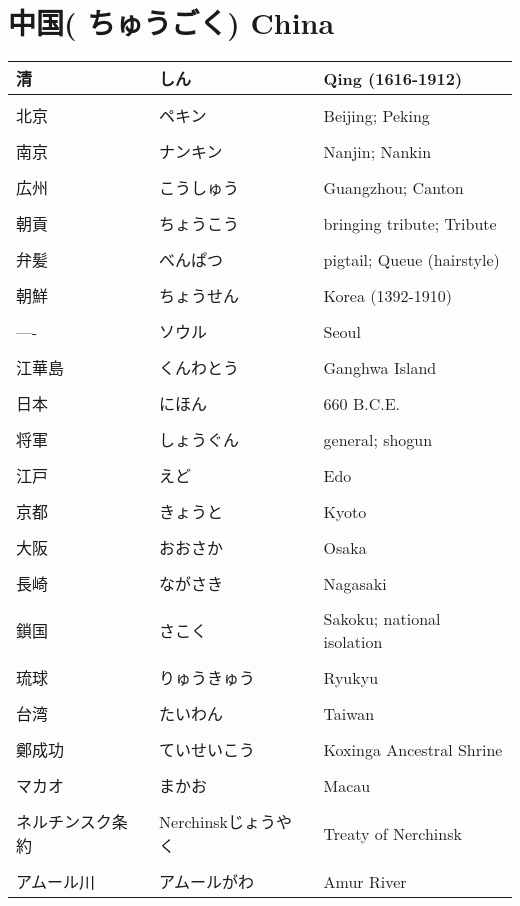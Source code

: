\documentclass{article}
\begin{document}
\section{中国( ちゅうごく) China}
\begin{tabular}{l | l | p{10.5cm}}
清 & しん &Qing (1616-1912)\\ \hline \\[-1em]
北京& ペキン & Beijing; Peking\\ \hline \\[-1em]
南京 & ナンキン & Nanjin; Nankin\\ \hline \\[-1em]
広州 & こうしゅう & Guangzhou; Canton\\ \hline \\[-1em]
朝貢 & ちょうこう & bringing tribute; Tribute\\ \hline \\[-1em]
弁髪 & べんぱつ & pigtail; Queue (hairstyle)\\ \hline \\[-1em]
朝鮮&  ちょうせん & Korea (1392-1910)\\ \hline \\[-1em]
---- & ソウル & Seoul \\ \hline \\[-1em]
江華島&くんわとう&Ganghwa Island\\ \hline \\[-1em]
日本& にほん & 660 B.C.E.\\ \hline \\[-1em]
将軍 & しょうぐん &general; shogun\\ \hline \\[-1em]
江戸& えど & Edo\\ \hline \\[-1em]
京都& きょうと &Kyoto\\ \hline \\[-1em]
大阪& おおさか &Osaka\\ \hline \\[-1em]
長崎& ながさき &Nagasaki\\ \hline \\[-1em]
鎖国& さこく &Sakoku; national isolation\\ \hline \\[-1em]
琉球& りゅうきゅう &Ryukyu\\ \hline \\[-1em]
台湾& たいわん &Taiwan\\ \hline \\[-1em]
鄭成功&ていせいこう&Koxinga Ancestral Shrine\\ \hline \\[-1em]
マカオ&まかお&Macau\\ \hline \\[-1em]
ネルチンスク条約 &Nerchinskじょうやく&Treaty of Nerchinsk\\ \hline \\[-1em]
アムール川&アムールがわ&Amur River%
\end{tabular}
\end{document}
